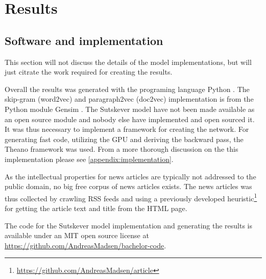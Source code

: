 \chapter{Results}

\section{Software and implementation}
This section will not discuss the details of the model implementations, but will just citrate the work required for creating the results.

Overall the results was generated with the programing language Python \cite{python}. The skip-gram (word2vec) and paragraph2vec (doc2vec) implementation is from the Python module Gensim \cite{gensim}. The Sutskever model \cite{sutskever} have not been made available as an open source module and nobody else have implemented and open sourced it. It was thus necessary to implement a framework for creating the network. For generating fast code, utilizing the GPU and deriving the backward pass, the Theano framework \cite{theano-a, theano-b} was used. From a more thorough discussion on the this implementation please see \autoref{appendix:implementation}.

As the intellectual properties for news articles are typically not addressed to the public domain, no big free corpus of news articles exists. The news articles was thus collected by crawling RSS feeds and using a previously developed heuristic\footnote{\url{https://github.com/AndreasMadsen/article}} for getting the article text and title from the HTML page.

The code for the Sutskever model implementation and generating the results is available under an MIT open source license at \url{https://github.com/AndreasMadsen/bachelor-code}.

\clearpage

\clearpage

